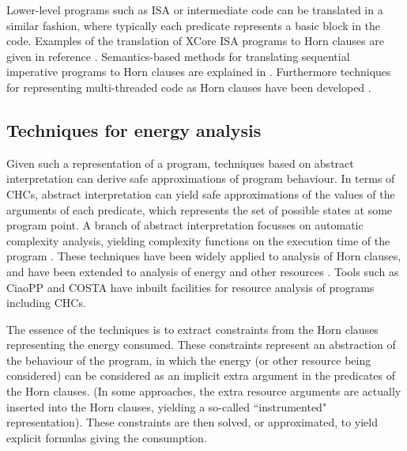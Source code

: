 Lower-level programs such as ISA or intermediate code can be translated
in a similar fashion, where typically each predicate represents a basic block 
in the code. Examples of the translation of XCore ISA programs
to Horn clauses are given in reference \cite{isa-energy-lopstr13-final}.
Semantics-based methods for translating sequential
imperative programs to
Horn clauses are explained in \cite{DBLP:conf/ppdp/AngelisFPP15}.
Furthermore techniques for representing multi-threaded
code as Horn clauses have been developed \cite{ GrebenshchikovLPR12}.


\subsection{Techniques for energy analysis}

Given such a representation of a program, techniques based on abstract interpretation \cite{Cousot1977}
can derive safe approximations of program behaviour.
In terms of CHCs, abstract interpretation can yield
safe approximations of the values of the arguments of each predicate, which represents the
set of possible
states at some program point.
A branch of abstract interpretation 
focusses on automatic complexity analysis, yielding complexity functions on the
execution time of the program \cite{DBLP:journals/cacm/Wegbreit75,Rosendahl89,caslog,resource-iclp07,jvm-cost-esop}.  
These techniques have been widely applied to
analysis of Horn clauses, and have been extended to analysis of energy and
other resources \cite{resource-iclp07,jvm-cost-esop}. Tools such as CiaoPP \cite{ciaopp-sas03-journal-scp} 
and COSTA \cite{AlbertAGPZ08b} have inbuilt
facilities for resource analysis of programs including CHCs.

The essence of the techniques is to extract constraints from the Horn clauses
representing the energy consumed. These constraints represent an abstraction of the behaviour
of the program, in which the energy (or other resource being considered)
can be considered as an implicit extra argument in the predicates of the Horn clauses.
(In some approaches, the extra resource arguments are actually inserted into
the Horn clauses, yielding a so-called ``instrumented" representation).
These constraints are then solved, or approximated, to yield explicit 
formulas giving the consumption.


 
